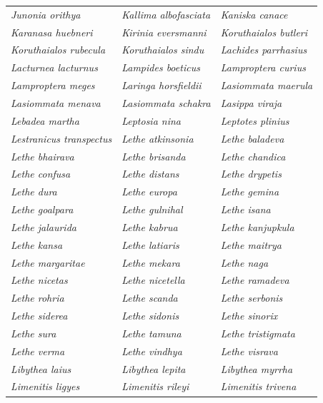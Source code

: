 \documentclass[runningheads]{llncs}
\begin{document}
\begin{longtable}{lll}
\textit{Junonia orithya} & \textit{Kallima albofasciata} & \textit{Kaniska canace} \\
\textit{Karanasa huebneri} & \textit{Kirinia eversmanni} & \textit{Koruthaialos butleri} \\
\textit{Koruthaialos rubecula} & \textit{Koruthaialos sindu} & \textit{Lachides parrhasius} \\
\textit{Lacturnea lacturnus} & \textit{Lampides boeticus} & \textit{Lamproptera curius} \\
\textit{Lamproptera meges} & \textit{Laringa horsfieldii} & \textit{Lasiommata maerula} \\
\textit{Lasiommata menava} & \textit{Lasiommata schakra} & \textit{Lasippa viraja} \\
\textit{Lebadea martha} & \textit{Leptosia nina} & \textit{Leptotes plinius} \\
\textit{Lestranicus transpectus} & \textit{Lethe atkinsonia} & \textit{Lethe baladeva} \\
\textit{Lethe bhairava} & \textit{Lethe brisanda} & \textit{Lethe chandica} \\
\textit{Lethe confusa} & \textit{Lethe distans} & \textit{Lethe drypetis} \\
\textit{Lethe dura} & \textit{Lethe europa} & \textit{Lethe gemina} \\
\textit{Lethe goalpara} & \textit{Lethe gulnihal} & \textit{Lethe isana} \\
\textit{Lethe jalaurida} & \textit{Lethe kabrua} & \textit{Lethe kanjupkula} \\
\textit{Lethe kansa} & \textit{Lethe latiaris} & \textit{Lethe maitrya} \\
\textit{Lethe margaritae} & \textit{Lethe mekara} & \textit{Lethe naga} \\
\textit{Lethe nicetas} & \textit{Lethe nicetella} & \textit{Lethe ramadeva} \\
\textit{Lethe rohria} & \textit{Lethe scanda} & \textit{Lethe serbonis} \\
\textit{Lethe siderea} & \textit{Lethe sidonis} & \textit{Lethe sinorix} \\
\textit{Lethe sura} & \textit{Lethe tamuna} & \textit{Lethe tristigmata} \\
\textit{Lethe verma} & \textit{Lethe vindhya} & \textit{Lethe visrava} \\
\textit{Libythea laius} & \textit{Libythea lepita} & \textit{Libythea myrrha} \\
\textit{Limenitis ligyes} & \textit{Limenitis rileyi} & \textit{Limenitis trivena} \\

\end{longtable}
\end{document}
